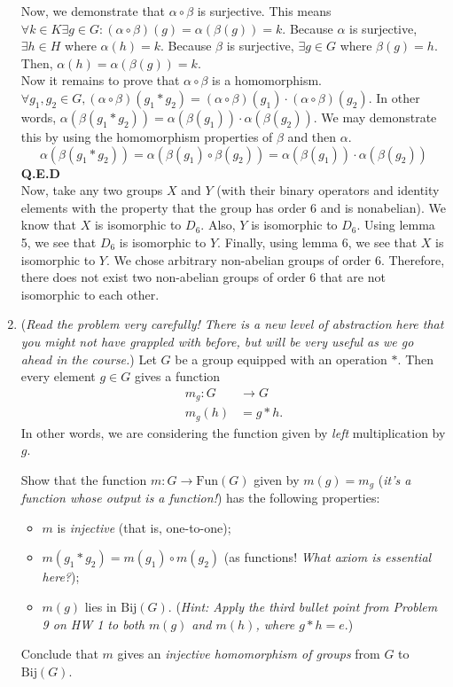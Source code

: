 \documentclass{amsart}
\begin{document}
\begin{enumerate}[itemsep=0.4in]
Now, we demonstrate that $\alpha\circ\beta$ is surjective. This means $\forall k\in K\exists g\in G:(\alpha\circ\beta)(g)=\alpha(\beta(g))=k$. Because $\alpha$ is surjective, $\exists h\in H$ where $\alpha(h)=k$. Because $\beta$ is surjective, $\exists g\in G$ where $\beta(g)=h$. Then, $\alpha(h)=\alpha(\beta(g))=k$. \\

Now it remains to prove that $\alpha\circ\beta$ is a homomorphism. $\forall g_1,g_2\in G,(\alpha\circ\beta)(g_1*g_2)=(\alpha\circ\beta)(g_1)\cdot(\alpha\circ\beta)(g_2)$. In other words, $\alpha(\beta(g_1*g_2))=\alpha(\beta(g_1))\cdot\alpha(\beta(g_2))$. We may demonstrate this by using the homomorphism properties of $\beta$ and then $\alpha$. $$\alpha(\beta(g_1*g_2))=\alpha(\beta(g_1)\circ\beta(g_2))=\alpha(\beta(g_1))\cdot\alpha(\beta(g_2))$$ \textbf{Q.E.D}\\

Now, take any two groups $X$ and $Y$ (with their binary operators and identity elements with the property that the group has order 6 and is nonabelian). We know that $X$ is isomorphic to $D_6$. Also, $Y$ is isomorphic to $D_6$. Using lemma 5, we see that $D_6$ is isomorphic to $Y$. Finally, using lemma 6, we see that $X$ is isomorphic to $Y$. We chose arbitrary non-abelian groups of order 6. Therefore, there does not exist two non-abelian groups of order 6 that are not isomorphic to each other.


\item (\emph{Read the problem very carefully! There is a new level of abstraction here that you might not have grappled with before, but will be very useful as we go ahead in the course.}) Let $G$ be a group equipped with an operation $*$. Then every element $g\in G$ gives a function
\begin{align*}
m_g: G &\to G\\
m_g(h)& = g*h.
\end{align*}
In other words, we are considering the function given by \emph{left} multiplication by $g$.

Show that the function $m: G\to \mathrm{Fun}(G)$ given by $m(g) = m_g$ (\emph{it's a function whose output is a function!}) has the following properties: 
\begin{itemize}
    \item $m$ is \emph{injective} (that is, one-to-one);
	\item $m(g_1*g_2) = m(g_1)\circ m(g_2)$  (as functions! \emph{What axiom is essential here?});
	\item $m(g)$ lies in $\mathrm{Bij}(G)$. (\emph{Hint: Apply the third bullet point from Problem 9 on HW 1 to both $m(g)$ and $m(h)$, where $g*h = e$}.)
\end{itemize}
Conclude that $m$ gives an \emph{injective homomorphism of groups} from $G$ to $\mathrm{Bij}(G)$.\\


\end{enumerate}
\end{document}
